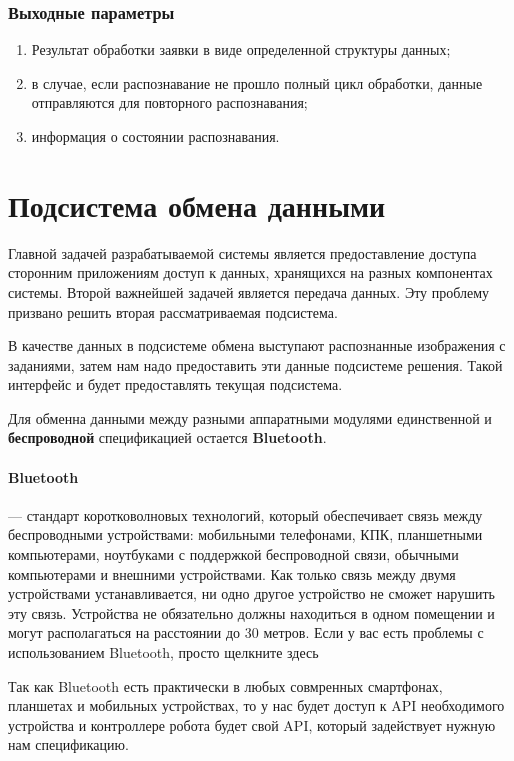 \subsubsection*{Выходные параметры}
\begin{enumerate}
 \item Результат обработки заявки в виде определенной структуры данных;
 \item в случае, если распознавание не прошло полный цикл обработки, данные отправляются для повторного распознавания;
 \item информация о состоянии распознавания.
\end{enumerate}

\section{Подсистема обмена данными}

Главной задачей разрабатываемой системы является предоставление доступа сторонним приложениям доступ к данных, хранящихся на разных компонентах системы. Второй важнейшей задачей является передача данных. Эту проблему призвано решить вторая рассматриваемая подсистема.

В качестве данных в подсистеме обмена выступают распознанные изображения с заданиями, затем нам надо предоставить эти данные подсистеме решения. Такой интерфейс и будет предоставлять текущая подсистема.

Для обменна данными между разными аппаратными модулями единственной и \textbf{беспроводной} спецификацией остается \textbf{Bluetooth}.  

\paragraph{Bluetooth}  —  стандарт коротковолновых технологий, который обеспечивает связь между беспроводными устройствами: мобильными телефонами, КПК, планшетными компьютерами, ноутбуками с поддержкой беспроводной связи, обычными компьютерами и внешними устройствами. Как только связь между двумя устройствами устанавливается, ни одно другое устройство не сможет нарушить эту связь. Устройства не обязательно должны находиться в одном помещении и могут располагаться на расстоянии до 30 метров. Если у вас есть проблемы с использованием Bluetooth, просто щелкните здесь

Так как Bluetooth есть практически в любых совмренных смартфонах, планшетах и мобильных устройствах, то у нас будет доступ к API необходимого устройства и контроллере робота будет свой API, который задействует нужную нам спецификацию.

